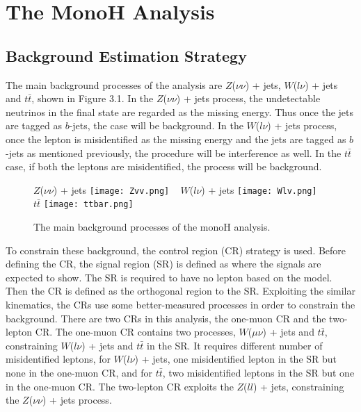 \documentclass[class=NTHU_thesis, crop=false]{standalone}
\begin{document}
\chapter{The MonoH Analysis}
\section{Background Estimation Strategy}
The main background processes of the analysis are $Z$($\nu\nu$) + jets, $W$($l\nu$) + jets and $t\bar{t}$, shown in Figure 3.1. In the $Z$($\nu\nu$) + jets process, the undetectable neutrinos in the final state are regarded as the missing energy. Thus once the jets are tagged as $b$-jets, the case will be background. In the $W$($l\nu$) + jets process, once the lepton is misidentified as the missing energy and the jets are tagged as $b$-jets as mentioned previously, the procedure will be interference as well. In the $t\bar{t}$ case, if both the leptons are misidentified, the process will be background.

\begin{figure}[!hbt]
	\captionsetup[subfigure]{labelformat=empty}
	\centering
	\subcaptionbox
	{$Z$($\nu\nu$) + jets
		\label{fig:subfig_fig1}}
	{\texttt{[image: Zvv.png]}}
	~
	\subcaptionbox
	{$W$($l\nu$) + jets
		\label{fig:subfig_fig2}}
	{\texttt{[image: Wlv.png]}}
	~
	\subcaptionbox
	{$t\bar{t}$
		\label{fig:subfig_fig3}}
	{\texttt{[image: ttbar.png]}}
	\caption{The main background processes of the monoH analysis.}
	\label{fig:label}
\end{figure}

To constrain these background, the control region (CR) strategy is used. Before defining the CR, the signal region (SR) is defined as where the signals are expected to show. The SR is required to have no lepton based on the model. Then the CR is defined as the orthogonal region to the SR. Exploiting the similar kinematics, the CRs use some better-measured processes in order to constrain the background. There are two CRs in this analysis, the one-muon CR and the two-lepton CR. The one-muon CR contains two processes, $W$($\mu\nu$) + jets and $t\bar{t}$, constraining $W$($l\nu$) + jets and $t\bar{t}$ in the SR. It requires different number of misidentified leptons, for $W$($l\nu$) + jets, one misidentified lepton in the SR but none in the one-muon CR, and for $t\bar{t}$, two misidentified leptons in the SR but one in the one-muon CR. The two-lepton CR exploits the $Z$($ll$) + jets, constraining the $Z$($\nu\nu$) + jets process.
\end{document}
